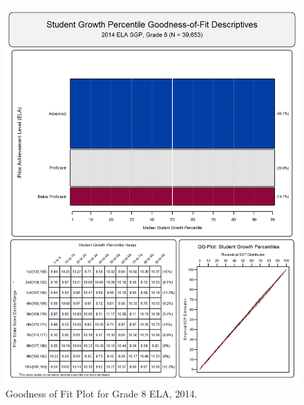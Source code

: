 \documentclass[12pt]{article}
\begin{document}
\begin{figure}[htbp]
\centering
\includegraphics{../img/Goodness_of_Fit/ELA.2014/2014_ELA_8;2013_ELA_7;2012_ELA_6;2011_ELA_5;2010_ELA_4;2009_ELA_3.png}
\caption{Goodness of Fit Plot for Grade 8 ELA, 2014.}
\end{figure}
\end{document}
